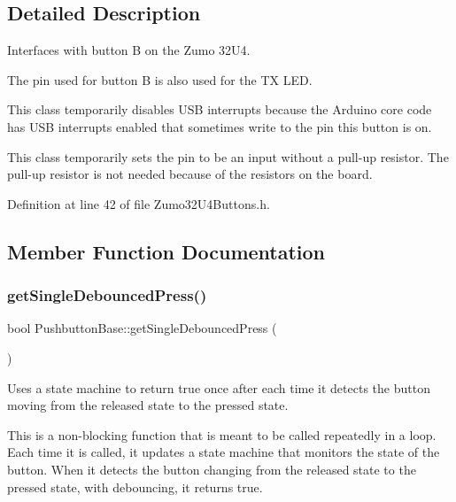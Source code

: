 \subsection{Detailed Description}
Interfaces with button B on the Zumo 32\+U4. 

The pin used for button B is also used for the TX L\+ED.

This class temporarily disables U\+SB interrupts because the Arduino core code has U\+SB interrupts enabled that sometimes write to the pin this button is on.

This class temporarily sets the pin to be an input without a pull-\/up resistor. The pull-\/up resistor is not needed because of the resistors on the board. 

Definition at line 42 of file Zumo32\+U4\+Buttons.\+h.



\subsection{Member Function Documentation}
\mbox{\label{class_pushbutton_base_a93953875c8b1c5f69dec3984774de296}} 
\subsubsection{\texorpdfstring{get\+Single\+Debounced\+Press()}{getSingleDebouncedPress()}}
{\footnotesize\ttfamily bool Pushbutton\+Base\+::get\+Single\+Debounced\+Press (\begin{DoxyParamCaption}{ }\end{DoxyParamCaption})\hspace{0.3cm}{\ttfamily [inherited]}}



Uses a state machine to return true once after each time it detects the button moving from the released state to the pressed state. 

This is a non-\/blocking function that is meant to be called repeatedly in a loop. Each time it is called, it updates a state machine that monitors the state of the button. When it detects the button changing from the released state to the pressed state, with debouncing, it returns true. 

